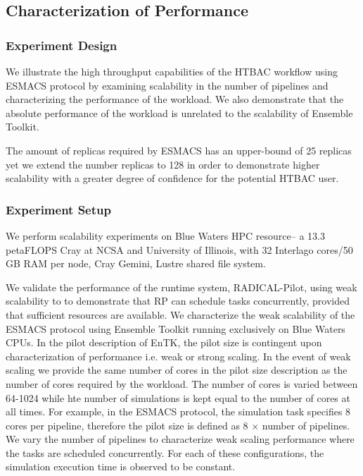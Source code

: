 \subsection{Characterization of Performance}

\subsubsection{Experiment Design}

We illustrate the high throughput capabilities of the HTBAC workflow using
ESMACS protocol by examining scalability in the number of pipelines and
characterizing the performance of the workload. We also demonstrate that the
absolute performance of the workload is unrelated to the scalability of
Ensemble Toolkit.

The amount of replicas required by ESMACS has an upper-bound of 25 replicas
yet we extend the number replicas to 128 in order to demonstrate higher
scalability with a greater degree of confidence for the potential HTBAC user.

\subsubsection{Experiment Setup}

We perform scalability experiments on Blue Waters HPC resource-- a 13.3
petaFLOPS Cray at NCSA and University of Illinois, with 32 Interlago cores/50
GB RAM per node, Cray Gemini, Lustre shared file system.

We validate the performance of the runtime system, RADICAL-Pilot, using weak
scalability to to demonstrate that RP can schedule tasks concurrently,
provided that sufficient resources are available. We characterize the weak
scalability of the ESMACS protocol using Ensemble Toolkit running exclusively
on Blue Waters CPUs. In the pilot description of EnTK, the pilot size is
contingent upon characterization of performance i.e. weak or strong scaling.
In the event of weak scaling we provide the same number of cores in the pilot
size description as the number of cores required by the workload. The number
of cores is varied between 64-1024 while hte number of simulations is kept
equal to the number of cores at all times. For example, in the ESMACS
protocol, the simulation task specifies 8 cores per pipeline, therefore the
pilot size is defined as 8 $\times$ number of pipelines. We vary the number
of pipelines to characterize weak scaling performance where the tasks are
scheduled concurrently. For each of these configurations, the simulation
execution time is observed to be constant.

